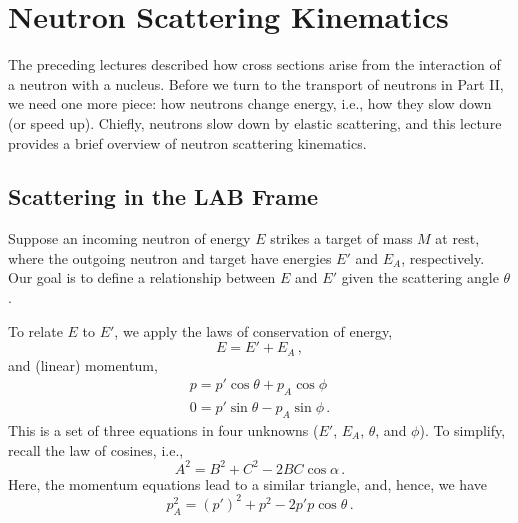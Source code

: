\chapter{Neutron Scattering Kinematics}
\label{lec:scattering_kinematics}

The preceding lectures described how cross sections arise from the
interaction of a neutron with a nucleus.  Before we turn to the transport
of neutrons in Part II, we need one more piece: how neutrons
change energy, i.e., how they slow down (or speed up).  Chiefly, neutrons 
slow down by elastic scattering, and this 
lecture provides a brief overview
of neutron scattering kinematics.

\section*{Scattering in the LAB Frame}

Suppose an incoming neutron of energy $E$ strikes a target of mass
$M$ at rest, where
the outgoing neutron and target have energies $E'$ and $E_A$, 
respectively.  Our goal is to define a relationship between 
$E$ and $E'$ given the scattering angle $\theta$.

To relate $E$ to $E'$, we apply the laws of conservation of energy,
\begin{equation}
  E = E' + E_A \, ,
\label{eq:conservation_energy}
\end{equation}
and (linear) momentum,
\begin{equation}
\begin{split}
 p = p' \cos \theta  + p_A \cos \phi \\
 0 = p' \sin \theta  - p_A \sin \phi \, .
\end{split}
\end{equation}
This is a set of three equations in four unknowns ($E'$, $E_A$, 
$\theta$, and $\phi$).  To simplify, recall the law of 
cosines, i.e.,
\begin{equation}
  A^2 = B^2 + C^2 - 2BC\cos \alpha \, .
\end{equation}
Here, the momentum equations lead to a similar triangle, and, hence,
we have
\begin{equation}
  p_A^2 = (p')^2 + p^2 - 2p'p \cos \theta \, .
\end{equation}

